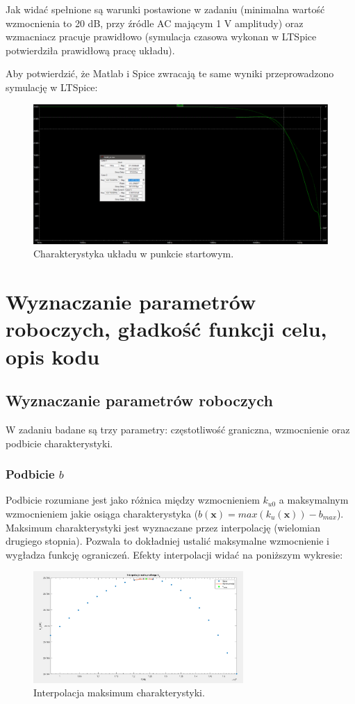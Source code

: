 \documentclass{article}
\begin{document}
Jak widać spełnione są warunki postawione w zadaniu (minimalna wartość wzmocnienia to 20 dB, przy źródle AC mającym 1 V amplitudy) oraz wzmacniacz pracuje prawidłowo (symulacja czasowa wykonan w LTSpice potwierdziła prawidłową pracę układu).
\pagebreak

Aby potwierdzić, że Matlab i Spice zwracają te same wyniki przeprowadzono symulację w LTSpice:
\begin{figure}[h]
	\includegraphics[width=12cm]{graphics/starting_point_spice.png}
	\centering
	\caption{Charakterystyka układu w punkcie startowym.}
\end{figure}




\section{Wyznaczanie parametrów roboczych, gładkość funkcji celu, opis kodu}
\subsection{Wyznaczanie parametrów roboczych}
W zadaniu badane są trzy parametry: częstotliwość graniczna, wzmocnienie oraz podbicie charakterystyki.

\subsubsection*{Podbicie $b$}
Podbicie rozumiane jest jako różnica między wzmocnieniem $k_{u0}$ a maksymalnym wzmocnieniem jakie osiąga charakterystyka ($b(\textbf{x})=max(k_{u}(\textbf{x}))-b_{max}$).
Maksimum charakterystyki jest wyznaczane przez interpolację (wielomian drugiego stopnia). Pozwala to dokładniej ustalić maksymalne wzmocnienie i wygładza funkcję ograniczeń.
Efekty interpolacji widać na poniższym wykresie:
\begin{figure}[h]
	\includegraphics[width=8cm]{graphics/max_ku_interp.png}
	\centering
	\caption{Interpolacja maksimum charakterystyki.}
\end{figure}
\pagebreak
\end{document}
